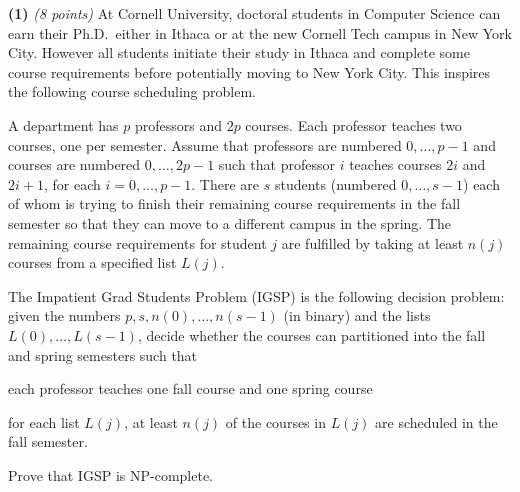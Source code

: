 \documentclass[11pt]{article}
\def\bigap{0.25in}
\begin{document}
\setlength{\parindent}{0in}
\addtolength{\parskip}{0.1cm}
\setlength{\fboxrule}{.5mm}\setlength{\fboxsep}{1.2mm}
\newlength{\boxlength}\setlength{\boxlength}{\textwidth}
\addtolength{\boxlength}{-4mm}
\begin{center}
\end{center}
\vspace{5mm}

{ \bf (1)} {\em (8 points)}
At Cornell University, doctoral students in Computer Science
can earn their Ph.D.\ either in Ithaca or at the new Cornell Tech
campus in New York City. However all students initiate their 
study in Ithaca and complete some course requirements 
before potentially moving to New York City. This inspires
the following course scheduling problem.

A department has $p$ professors and $2p$ courses. Each
professor teaches two courses, one per semester. Assume 
that professors are numbered $0,\ldots,p-1$ and courses
are numbered $0,\ldots,2p-1$ such that professor $i$
teaches courses $2i$ and $2i+1$, for each $i=0,\ldots,p-1$.
There are $s$ students (numbered $0,\ldots,s-1$)
each of whom is trying
to finish their remaining course requirements in the fall semester
so that they can move to a different campus in the spring. 
The remaining course requirements for student $j$ are fulfilled by 
taking at least $n(j)$ courses from a specified list 
$L(j)$. 

The {\sc Impatient Grad Students Problem (IGSP)} is the
following decision problem: given the numbers $p,s,
n(0),\ldots,n(s-1)$ (in binary) and the lists $L(0),\ldots,L(s-1)$,
decide whether the courses can partitioned into the 
fall and spring semesters such that
\begin{compactenum}
\item each professor teaches one fall course and one spring course
\item for each list $L(j)$, at least $n(j)$ of the courses in $L(j)$ 
  are scheduled in the fall semester.
\end{compactenum}
Prove that {\sc IGSP} is NP-complete.

\vskip \bigap

\end{document}
